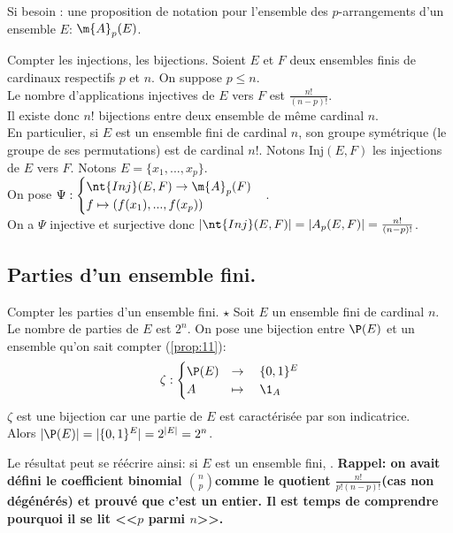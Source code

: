 \documentclass[11pt]{article}
\begin{document}
Si besoin : une proposition de notation pour l'ensemble des $p$-arrangements d'un ensemble $E$: $\m{A}_p(E)$.

\begin{corr}{Compter les injections, les bijections.}{}
    Soient $E$ et $F$ deux ensembles finis de cardinaux respectifs $p$ et $n$. On suppose $p\leq n$.\\
    Le nombre d'applications injectives de $E$ vers $F$ est $\frac{n!}{(n-p)!}$.\\
    Il existe donc $n!$ bijections entre deux ensemble de même cardinal $n$.\\
    En particulier, si $E$ est un ensemble fini de cardinal $n$, son groupe symétrique (le groupe de ses permutations) est de cardinal $n!$.
    \tcblower
    Notons Inj$(E,F)$ les injections de $E$ vers $F$. Notons $E=\{x_1,...,x_p\}$.\\
    On pose $\Psi:\begin{cases}
        \nt{Inj}(E,F)\to\m{A}_p(F)\\
        f\mapsto (f(x_1),...,f(x_p))
    \end{cases}$.\\
    On a $\Psi$ injective et surjective donc $|\nt{Inj}(E,F)|=|A_p(E,F)|=\frac{n!}{(n-p)!}$.
\end{corr}

\subsection{Parties d'un ensemble fini.}

\begin{prop}{Compter les parties d'un ensemble fini. $\star$}{}
    Soit $E$ un ensemble fini de cardinal $n$.\\
    Le nombre de parties de $E$ est $2^n$.
    \tcblower
    On pose une bijection entre $\P(E)$ et un ensemble qu'on sait compter (\ref{prop:11}):
    \begin{equation*}
        \zeta:\begin{cases}
            \P(E)&\to\quad \{0,1\}^E\\
            A&\mapsto\quad\1_A
        \end{cases}
    \end{equation*}
    $\zeta$ est une bijection car une partie de $E$ est caractérisée par son indicatrice.\\
    Alors $|\P(E)|=|\{0,1\}^E|=2^{|E|}=2^n$.
\end{prop}

Le résultat peut se réécrire ainsi: si $E$ est un ensemble fini, .\n
\bf{Rappel:} on avait défini le coefficient binomial \Large$\binom{n}{p}$\normalsize comme le quotient \Large$\frac{n!}{p!(n-p)!}$\normalsize (cas non dégénérés) et prouvé que c'est un entier. Il est temps de comprendre pourquoi il se lit <<$p$ parmi $n$>>.
\end{document}
